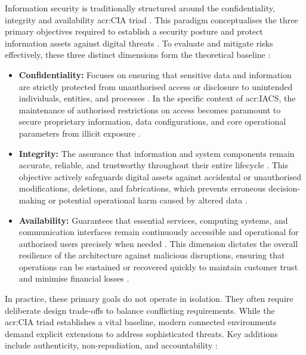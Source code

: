 Information security is traditionally structured around the confidentiality, integrity and availability \gls{acr:CIA} triad \cite{CIAtriadEICTA2026} \cite[p. 1]{app16126260}. This paradigm conceptualises the three primary objectives required to establish a security posture and protect information assets against digital threats \cite[p. 5]{Khanna2024}. To evaluate and mitigate risks effectively, these three distinct dimensions form the theoretical baseline \cite[p. 24]{app16126260}:

\begin{itemize}
	\item \textbf{Confidentiality:} Focuses on ensuring that sensitive data and information are strictly protected from unauthorised access or disclosure to unintended individuals, entities, and processes \cite[p. 4]{Khanna2024} \cite[p. 3]{app16126260}. In the specific context of \gls{acr:IACS}, the maintenance of authorised restrictions on access becomes paramount to secure proprietary information, data configurations, and core operational parameters from illicit exposure \cite[p. 23]{IEC62443-3-3}.
	\item \textbf{Integrity:} The assurance that information and system components remain accurate, reliable, and trustworthy throughout their entire lifecycle \cite[p. 4]{Khanna2024} \cite[p. 3]{app16126260}. This objective actively safeguards digital assets against accidental or unauthorised modifications, deletions, and fabrications, which prevents erroneous decision-making or potential operational harm caused by altered data \cite[pp. 4]{Khanna2024}.
	\item \textbf{Availability:} Guarantees that essential services, computing systems, and communication interfaces remain continuously accessible and operational for authorised users precisely when needed \cite[pp. 4]{Khanna2024} \cite[p. 3]{app16126260}. This dimension dictates the overall resilience of the architecture against malicious disruptions, ensuring that operations can be sustained or recovered quickly to maintain customer trust and minimise financial losses \cite[p. 5]{Khanna2024}.
\end{itemize}

In practice, these primary goals do not operate in isolation. They often require deliberate design trade-offs to balance conflicting requirements. While the \gls{acr:CIA} triad establishes a vital baseline, modern connected environments demand explicit extensions to address sophisticated threats. Key additions include authenticity, non-repudiation, and accountability \cite[pp. 102]{doCarmo2025} \cite{CIAtriadEICTA2026}:


